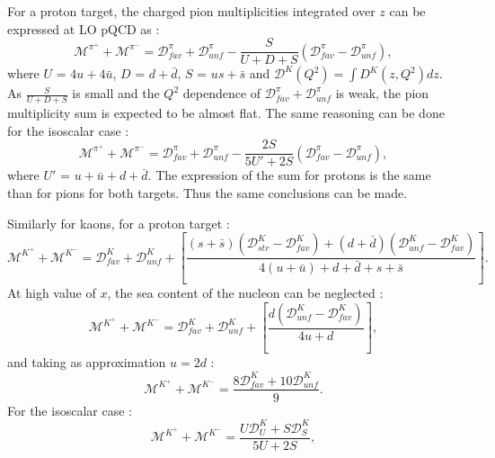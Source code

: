 For a proton target, the charged pion multiplicities integrated over $z$ can be expressed at LO pQCD as :
%
\begin{equation}\label{eq:pisum}
  \mathscr{M}^{\pi^+}+\mathscr{M}^{\pi^-} = \mathscr{D}^{\pi}_{fav} + \mathscr{D}^{\pi}_{unf} - \frac{S}{U+D+S} \left( \mathscr{D}^{\pi}_{fav} - \mathscr{D}^{\pi}_{unf} \right),
\end{equation}
%
where $U$ = $4u+4\bar{u}$, $D$ = $d+\bar{d}$, $S$ = $us+\bar{s}$ and $\mathscr{D}^K(Q^2) = \int D^K(z,Q^2) dz $. As $\frac{S}{U+D+S}$ is small and the $Q^2$ dependence of $\mathscr{D}^{\pi}_{fav} + \mathscr{D}^{\pi}_{unf}$ is weak, the pion multiplicity sum is expected to be almost flat. The same reasoning can be done for the isoscalar case :
%
\begin{equation}
  \mathscr{M}^{\pi^+}+\mathscr{M}^{\pi^-} = \mathscr{D}^{\pi}_{fav} + \mathscr{D}^{\pi}_{unf} - \frac{2S}{5U'+2S} \left( \mathscr{D}^{\pi}_{fav} - \mathscr{D}^{\pi}_{unf} \right),
\end{equation}
%
where $U'$ = $u+\bar{u}+d+\bar{d}$. The expression of the sum for protons is the same than for pions for both targets. Thus the same conclusions can be made.

Similarly for kaons, for a proton target :
%
\begin{equation}
  \mathscr{M}^{K^+}+\mathscr{M}^{K^-} = \mathscr{D}^K_{fav}+\mathscr{D}^K_{unf}+\left[\frac{(s+\bar{s})\left( \mathscr{D}^K_{str}-\mathscr{D}^K_{fav} \right) + (d+\bar{d})\left( \mathscr{D}^K_{unf}-\mathscr{D}^K_{fav} \right)}{4(u+\bar{u}) + d + \bar{d} + s + \bar{s}} \right].
\end{equation}
%
At high value of $x$, the sea content of the nucleon can be neglected :
%
\begin{equation}
  \mathscr{M}^{K^+}+\mathscr{M}^{K^-} = \mathscr{D}^K_{fav}+\mathscr{D}^K_{unf}+\left[\frac{d\left( \mathscr{D}^K_{unf}-\mathscr{D}^K_{fav} \right)}{4u + d} \right],
\end{equation}
%
and taking as approximation $u=2d$ :
%
\begin{equation}
  \mathscr{M}^{K^+}+\mathscr{M}^{K^-} = \frac{8\mathscr{D}^K_{fav}+10\mathscr{D}^K_{unf}}{9}.
\end{equation}
%
For the isoscalar case :
%
\begin{equation}\label{eq:ksum}
  \mathscr{M}^{K^+}+\mathscr{M}^{K^-} = \frac{U\mathscr{D}^K_U+S\mathscr{D}^K_S}{5U+2S},
\end{equation}
%


